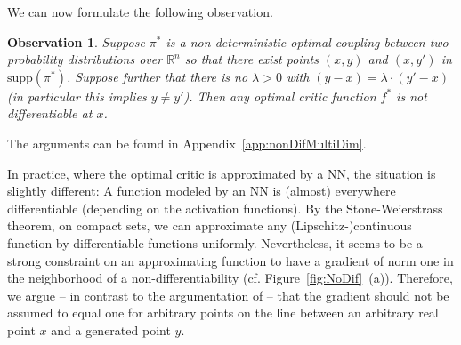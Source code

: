 \documentclass{article} %
\newcommand{\RR}[1][]{\mathbb{R}^{#1}}
\newcommand{\supp}[1]{\text{supp}({#1})}
\newtheorem{observation}{Observation}
\begin{document}
We can now formulate the following observation.
%
%
%
\begin{observation}\label{obs:nonDifMultiDim}
Suppose $\pi^*$ is a non-deterministic optimal coupling between two probability distributions over $\RR[n]$ so that there exist points $(x,y)$ and $(x,y')$ in $\supp{\pi^*}$. Suppose further that there is no $\lambda>0$ with $(y-x)=\lambda\cdot (y'-x)$ (in particular this implies $y\neq y'$). Then any optimal critic function $f^*$ is not differentiable at $x$. 
\end{observation}
%
%
The arguments can be found in Appendix~\ref{app:nonDifMultiDim}.
 
In practice, where the optimal critic is approximated by a NN, the situation is slightly different:
A function modeled by an NN is (almost) everywhere differentiable (depending on the activation functions). By the Stone-Weierstrass theorem, on compact sets, we can approximate any \mbox{(Lipschitz-)}continuous function by differentiable functions uniformly. Nevertheless, it seems to be a strong constraint on an approximating function to have a gradient of norm one in the neighborhood of a non-differentiability (cf. Figure~\ref{fig:NoDif}~(a)). Therefore, we argue  -- in contrast to the argumentation of \citet{iWGAN} -- that the gradient should not be assumed to equal one for arbitrary points on the line between an arbitrary real point $x$ and a generated point $y$.

\end{document}
